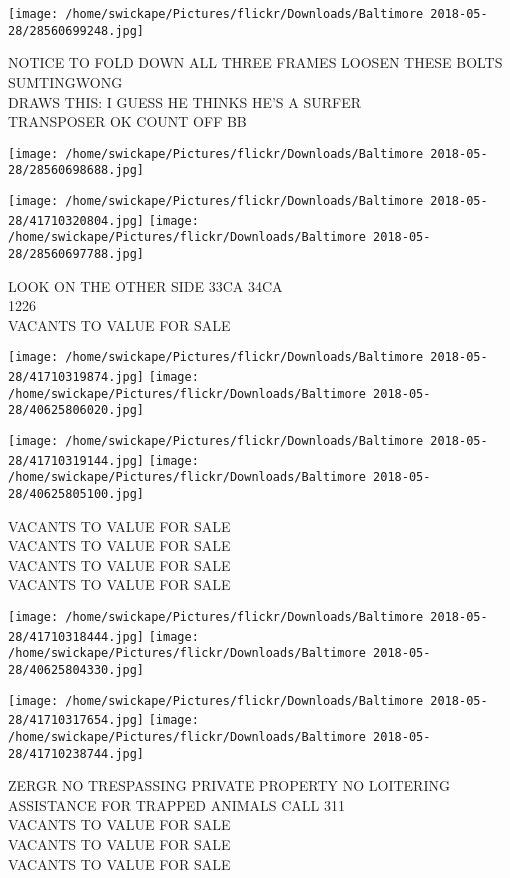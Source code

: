 \documentclass[10pt,letterpaper]{article}
\begin{document}
\texttt{[image: /home/swickape/Pictures/flickr/Downloads/Baltimore 2018-05-28/28560699248.jpg]}

NOTICE TO FOLD DOWN ALL THREE FRAMES LOOSEN THESE BOLTS SUMTINGWONG\\
DRAWS THIS: I GUESS HE THINKS HE'S A SURFER\\
TRANSPOSER OK COUNT OFF BB
\pagebreak

\texttt{[image: /home/swickape/Pictures/flickr/Downloads/Baltimore 2018-05-28/28560698688.jpg]}

\vspace{0.25in}
\texttt{[image: /home/swickape/Pictures/flickr/Downloads/Baltimore 2018-05-28/41710320804.jpg]}
\texttt{[image: /home/swickape/Pictures/flickr/Downloads/Baltimore 2018-05-28/28560697788.jpg]}

LOOK ON THE OTHER SIDE 33CA 34CA\\
1226\\
VACANTS TO VALUE FOR SALE
\pagebreak

\texttt{[image: /home/swickape/Pictures/flickr/Downloads/Baltimore 2018-05-28/41710319874.jpg]}
\texttt{[image: /home/swickape/Pictures/flickr/Downloads/Baltimore 2018-05-28/40625806020.jpg]}

\texttt{[image: /home/swickape/Pictures/flickr/Downloads/Baltimore 2018-05-28/41710319144.jpg]}
\texttt{[image: /home/swickape/Pictures/flickr/Downloads/Baltimore 2018-05-28/40625805100.jpg]}

VACANTS TO VALUE FOR SALE\\
VACANTS TO VALUE FOR SALE\\
VACANTS TO VALUE FOR SALE\\
VACANTS TO VALUE FOR SALE
\pagebreak

\texttt{[image: /home/swickape/Pictures/flickr/Downloads/Baltimore 2018-05-28/41710318444.jpg]}
\texttt{[image: /home/swickape/Pictures/flickr/Downloads/Baltimore 2018-05-28/40625804330.jpg]}

\texttt{[image: /home/swickape/Pictures/flickr/Downloads/Baltimore 2018-05-28/41710317654.jpg]}
\texttt{[image: /home/swickape/Pictures/flickr/Downloads/Baltimore 2018-05-28/41710238744.jpg]}

ZERGR NO TRESPASSING PRIVATE PROPERTY NO LOITERING ASSISTANCE FOR TRAPPED ANIMALS CALL 311\\
VACANTS TO VALUE FOR SALE\\
VACANTS TO VALUE FOR SALE\\
VACANTS TO VALUE FOR SALE
\pagebreak
\end{document}
